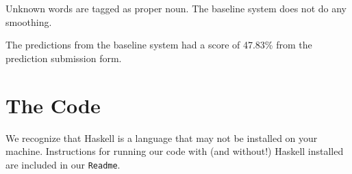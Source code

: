 \documentclass{article}
\begin{document}
Unknown words are tagged as proper noun.
The baseline system does not do any smoothing.

The predictions from the baseline system had a score of 47.83\%
from the prediction submission form.


\section{The Code}

We recognize that Haskell is a language that may not be installed on your
machine.  Instructions for running our code with (and without!) Haskell
installed are included in our \verb+Readme+.
\end{document}
